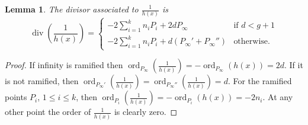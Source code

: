 \documentclass[11pt]{article} %
\newtheorem{lem}{Lemma}
\theoremstyle{remark}\newtheorem*{rem}{Remark}
\DeclareMathOperator{\ord}{ord}
\DeclareMathOperator{\di}{div}
\begin{document}
 \begin{lem}
  The divisor associated to $\frac{1}{h(x)}$ is
  \[
  \di \left(\frac{1}{h(x)}\right) = \left \{
  \begin{array}{ll}
   -2\sum_{i=1}^k n_i P_i + 2dP_{\infty} & \mbox{if } d<g+1\\
   -2\sum_{i=1}^k n_i P_i + d(P_{\infty}' + P_{\infty}'') & \mbox{otherwise.}
  \end{array}\right.
 \]
 \end{lem}
\begin{proof}
If infinity is ramified then $\ord_{P_{\infty}}\left(\frac{1}{h(x)}\right) = -\ord_{P_{\infty}}(h(x)) = 2d$.
If it is not ramified, then $\ord_{P_{\infty}'}\left(\frac{1}{h(x)}\right) = \ord_{P_{\infty}''}\left(\frac{1}{h(x)}\right)=d$.
For the ramified points $P_i$, $1\leq i \leq k$, then $\ord_{P_i}\left(\frac{1}{h(x)}\right) = -\ord_{P_i}(h(x))= -2n_i$.
At any other point the order of $\frac{1}{h(x)}$ is clearly zero.
\end{proof}
\end{document}

